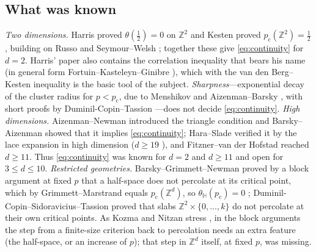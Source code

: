 \documentclass[11pt]{article}
\theoremstyle{definition}
\theoremstyle{remark}
\newcommand{\Zd}{\mathbb{Z}^d}
\newcommand{\ZZ}{\mathbb{Z}}
\newcommand{\pc}{p_{\mathrm c}}
\newcommand{\HH}{\mathbb{H}}
\begin{document}
\subsection{What was known}\label{ss:history}
\emph{Two dimensions.}  Harris \citep{HarrisPCPS1960} proved $\theta(\tfrac12)=0$ on $\ZZ^2$ and Kesten \citep{KestenCMP1980} proved
$\pc(\ZZ^2)=\tfrac12$, building on Russo \citep{Russo1978} and Seymour--Welsh \citep{SeymourWelsh1978}; together these give
\eqref{eq:continuity} for $d=2$.  Harris' paper also contains the correlation inequality that bears his name (in general form
Fortuin--Kasteleyn--Ginibre \citep{FortuinKasteleynGinibreCMP1971}), which with the van den Berg--Kesten inequality \citep{VandenBergKesten1985}
is the basic tool of the subject.  \emph{Sharpness}---exponential decay of the cluster radius for $p<\pc$, due to Menshikov
\citep{Menshikov1986} and Aizenman--Barsky \citep{AizenmanBarsky1987}, with short proofs by Duminil-Copin--Tassion
\citep{DuminilCopinTassionCMP2016,DuminilCopinTassionEM2016}---does not decide \eqref{eq:continuity}.
\emph{High dimensions.}  Aizenman--Newman \citep{AizenmanNewman1984} introduced the triangle condition and Barsky--Aizenman
\citep{BarskyAizenman1991} showed that it implies \eqref{eq:continuity}; Hara--Slade \citep{HaraSlade1990} verified it by the lace expansion in
high dimension ($d\ge19$ \citep[Thm.~2.7]{HaraSlade1994}), and Fitzner--van der Hofstad \citep{FitznerVanDerHofstad2017} reached $d\ge11$.
Thus \eqref{eq:continuity} was known for $d=2$ and $d\ge11$ and open for $3\le d\le10$.
\emph{Restricted geometries.}  Barsky--Grimmett--Newman \citep{BarskyGrimmettNewman1991} proved by a block argument at fixed $p$ that a
half-space does not percolate at its critical point, which by Grimmett--Marstrand \citep{GrimmettMarstrand1990} equals $\pc(\Zd)$, so
$\theta_{\HH}(\pc)=0$ \citep[Thms.~(7.2), (7.35)]{GrimmettPercolation1999}; Duminil-Copin--Sidoravicius--Tassion
\citep{DuminilCopinSidoraviciusTassion2016} proved that slabs $\ZZ^2\times\{0,\dots,k\}$ do not percolate at their own critical points.  As
Kozma and Nitzan stress \citep[\S1]{KozmaNitzan2024}, in the block arguments the step from a finite-size criterion back to percolation needs an
extra feature (the half-space, or an increase of $p$); that step in $\Zd$ itself, at fixed $p$, was missing.
\end{document}
